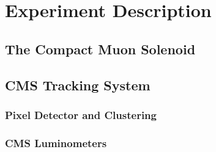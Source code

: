 \chapter{Experiment Description }



\section{The Compact Muon Solenoid}


\section{CMS Tracking System}


\subsection{Pixel Detector and Clustering}

\subsection{CMS Luminometers}

